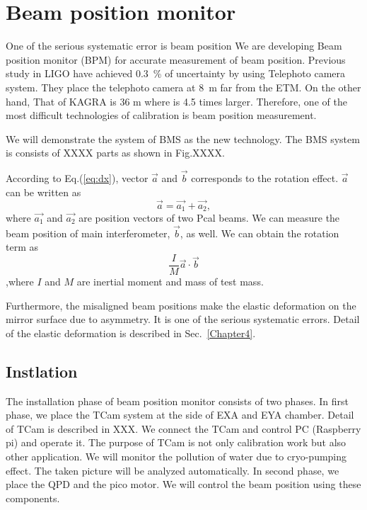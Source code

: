 
\chapter{Beam position monitor} %

\label{Chapter6} %
One of the serious systematic error is beam position
We are developing Beam position monitor (BPM) for accurate measurement of beam position.
Previous study in LIGO have achieved 0.3~\% of uncertainty by using Telephoto camera system.
They place the telephoto camera at 8~m far from the ETM. On the other hand, That of KAGRA is 36 m where is 4.5 times larger. Therefore, one of the most difficult technologies of calibration is beam position measurement.

We will demonstrate the system of BMS as  the new technology. The BMS system is consists of XXXX parts as shown in Fig.XXXX.

According to Eq.(\ref{eq:dx}), vector $\vec{a}$ and $\vec{b}$ corresponds to the rotation effect. $\vec{a}$ can be written as
\begin{equation}
\vec{a}=\vec{a_1} + \vec{a_2},
\end{equation}
where $\vec{a_1}$ and $\vec{a_2}$ are position vectors of two Pcal beams. We can measure the beam position of main interferometer, $\vec{b}$, as well.
We can obtain the rotation term as
\begin{equation}
\frac{I}{M}\vec{a} \cdot \vec{b}
\end{equation}
,where $I$ and $M$ are inertial moment and mass of test mass.

Furthermore, the misaligned beam positions make the elastic deformation on the mirror surface due to asymmetry. It is one of the serious systematic errors.
Detail of the elastic deformation is described in Sec.~\ref{Chapter4}.

\section{Instlation}
The installation phase of beam position monitor consists of two phases.
In first phase, we place the TCam system at the side of EXA and EYA chamber.
Detail of TCam is described in XXX. We connect the TCam and control PC (Raspberry pi) and operate it.
The purpose of TCam is not only calibration work but also other application.
We will monitor the pollution of water due to cryo-pumping effect. The taken picture will be analyzed automatically.
In second phase, we place the QPD and the pico motor. We will control the beam position using these components.
